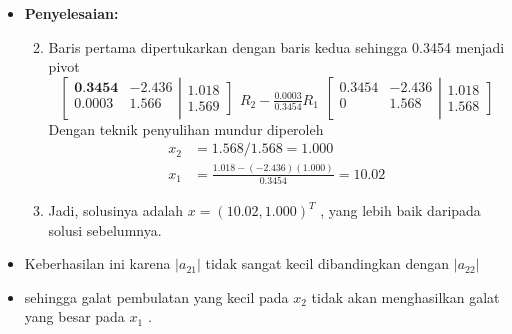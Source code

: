 \documentclass[pdflatex,compress,mathserif]{beamer}
\begin{document}
\begin{frame}
	\begin{itemize}
		\item \textbf{Penyelesaian:}
		\begin{enumerate}
		   \setcounter{enumi}{1}
		   \item Baris pertama dipertukarkan dengan baris kedua sehingga 0.3454 menjadi pivot
			\[
			\left[
				\begin{matrix}
					\textbf{0.3454} & -2.436 \\
					0.0003 & 1.566 \\
				\end{matrix}
			\right|			
			\left.
				\begin{matrix}
					1.018 \\ 1.569 
				\end{matrix}
			\right]
			\begin{matrix}
				\\
				R_2 - \frac{0.0003}{0.3454}R_1
			\end{matrix}
			\left[
				\begin{matrix}
					0.3454 & -2.436 \\
					0 & 1.568 \\
				\end{matrix}
			\right|			
			\left.
				\begin{matrix}
					1.018 \\ 1.568 
				\end{matrix}
			\right]
			\]
			Dengan teknik penyulihan mundur diperoleh
			\begin{align*}
				x_2 &= 1.568 / 1.568 = 1.000 \\
				x_1 &= \frac{1.018-(-2.436)(1.000)}{0 . 3454} = 10.02
			\end{align*}
			\item[] Jadi, solusinya adalah $ x = (10.02, 1.000)^T $ , yang lebih baik daripada solusi sebelumnya.
		\end{enumerate}
	\end{itemize}
\end{frame}

\begin{frame}
	\begin{itemize}
		\item Keberhasilan ini karena $ | a_{21} | $ tidak sangat kecil dibandingkan dengan $ | a_{22} | $
		\item sehingga galat pembulatan yang kecil pada $ x_2 $ tidak akan menghasilkan galat yang besar pada $ x_1 $ . 
	\end{itemize}
\end{frame}
\end{document}
